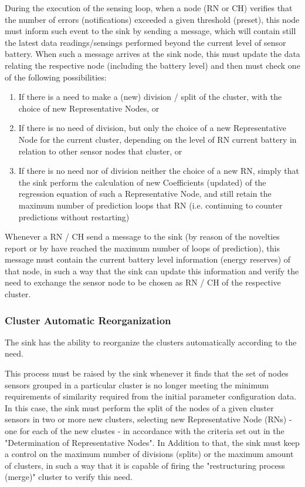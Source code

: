\documentclass[conference]{IEEEtran}
\begin{document}
During the execution of the sensing loop, when a node (RN or CH) verifies
that the number of errors (notifications) exceeded a given threshold (preset), this
node must inform such event to the sink by sending a message, which will contain
still the latest data readings/sensings performed beyond the current level of
sensor battery. 
When such a message arrives at the sink node, this must update
the data relating the respective node (including the battery level) and then
must check one of the following possibilities:

\begin{enumerate}
    \item If there is a need to make a (new) division / split of the cluster,
    with the choice of new Representative Nodes, or
    \item If there is no need of division, but only the choice of a new
    Representative Node for the current cluster, depending on the level of RN
    current battery in relation to other sensor nodes that cluster, or
    \item If there is no need nor of division neither the choice of a new RN,
    simply that the sink perform the calculation of new Coefficients (updated)
    of the regression equation of such a Representative Node, and still retain
    the maximum number of prediction loops that RN (i.e. continuing to counter
    predictions without restarting)
\end{enumerate}


Whenever a RN / CH send a message to the sink (by reason of the novelties report
or by have reached the maximum number of loops of prediction), this message must
contain the current battery level information (energy reserves) of that node, in
such a way that the sink can update this information and verify the need to
exchange the sensor node to be chosen as RN / CH of the respective cluster.

\subsubsection{Cluster Automatic Reorganization}

The sink has the ability to reorganize the clusters automatically according to
the need.

This process must be raised by the sink whenever it finds that the set of nodes
sensors grouped in a particular cluster is no longer meeting the minimum
requirements of similarity required from the initial parameter
configuration data. In this case, the sink must perform the split of the nodes
of a given cluster sensors in two or more new clusters, selecting new
Representative Node (RNs) - one for each of the new clustes - in accordance with
the criteria set out in the "Determination of Representative Nodes". In Addition
to that, the sink must keep a control on the maximum number of divisions
(splits) or the maximum amount of clusters, in such a way that it is capable of
firing the "restructuring process (merge)" cluster to verify this need.
\end{document}
